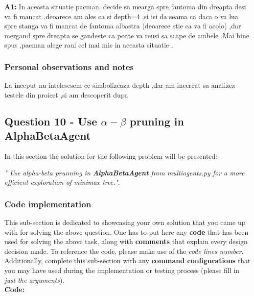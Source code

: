 \textbf{A1:} In aceasta situatie pacman, decide sa mearga spre fantoma din dreapta  desi va fi mancat ,deoarece am ales ca si depth=4 ,si isi da seama ca daca o va lua spre stanga va fi mancat de fantoma albastra (deoarece stie ca va fi acolo) ,dar mergand spre dreapta se gandeste ca poate va reusi sa scape de ambele .Mai bine spus ,pacman alege raul cel mai mic in aceasta situatie .


\subsubsection{Personal observations and notes}
La inceput nu intelesesem ce simbolizeaza depth ,dar am incercat sa analizez testele din proiect ,si am descoperit dupa


\vspace{0.75cm}

\subsection{Question 10 -  Use $\alpha - \beta$ pruning in AlphaBetaAgent}
In this section the solution for the following problem will be presented: \newline

\textit{" Use alpha-beta prunning in \textbf{AlphaBetaAgent} from multiagents.py for a more efficient exploration of minimax tree."}.


\subsubsection{Code implementation}
This sub-section is dedicated to showcasing your own solution that you came up with for solving the above question. One has to put here any \textbf{code} that has been used for solving the above task, along with \textbf{comments} that explain every design decision made. To reference the code, please make use of the \textit{code lines number}. Additionally, complete this sub-section with any \textbf{command configurations} that you may have used during the implementation or testing process (please fill in \textit{just the arguments}). \\

\textbf{Code:}

\inputminted[linenos]{python}{code/10_ab_prunning.py}


